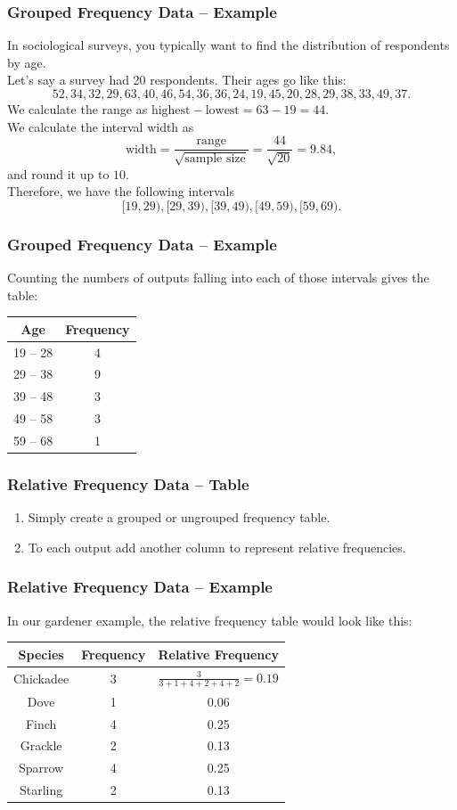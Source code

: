 \documentclass[aspectratio=169,11pt,svgnames]{beamer}
\begin{document}
\begin{frame}
 \frametitle{Grouped Frequency Data -- Example}
 In sociological surveys, you typically want to find the distribution of
 respondents by age.\\
 \pause
 Let's say a survey had 20 respondents. Their ages go like this:
 \[
  52, 34, 32, 29, 63, 40, 46, 54, 36, 36, 24, 19, 45, 20, 28, 29, 38, 33, 49,
  37.
 \]
 \pause
 We calculate the range as $\text{highest} - \text{lowest} = 63 - 19 = 44$.\\
 We calculate the interval width as
 \[
  \text{width} = \frac{\text{range}}{\sqrt{\text{sample size}}} =
  \frac{44}{\sqrt{20}} = 9.84,
 \]
 and round it up to $10$.\\
 \pause
 Therefore, we have the following intervals
 \[
  [19, 29), [29, 39), [39, 49), [49, 59), [59, 69).
 \]
\end{frame}

\begin{frame}
 \frametitle{Grouped Frequency Data -- Example}
 Counting the numbers of outputs falling into each of those intervals gives the
 table:
 \begin{center}
  \begin{tabular}{c|c}
   \textbf{Age} & \textbf{Frequency}\\
   \toprule
   19 -- 28 & 4\\
   29 -- 38 & 9\\
   39 -- 48 & 3\\
   49 -- 58 & 3\\
   59 -- 68 & 1
  \end{tabular}
 \end{center}
\end{frame}

\begin{frame}
 \frametitle{Relative Frequency Data -- Table}
 \begin{enumerate}
  \item Simply create a grouped or ungrouped frequency table.
  \pause
  \item To each output add another column to represent \alert{relative
   frequencies}.
 \end{enumerate}
\end{frame}

\begin{frame}
 \frametitle{Relative Frequency Data -- Example}
 In our gardener example, the relative frequency table would look like this:
 \begin{center}
  \begin{tabular}{c|c|c}
   \textbf{Species} & \textbf{Frequency} & \textbf{Relative Frequency}\\
   \toprule
   Chickadee & 3 & $\frac{3}{3 + 1 + 4 + 2 + 4 + 2} = 0.19$\\
   Dove & 1 & 0.06\\
   Finch & 4 & 0.25\\
   Grackle & 2 & 0.13\\
   Sparrow & 4 & 0.25\\
   Starling & 2 & 0.13
  \end{tabular}
 \end{center}
\end{frame}
\end{document}
